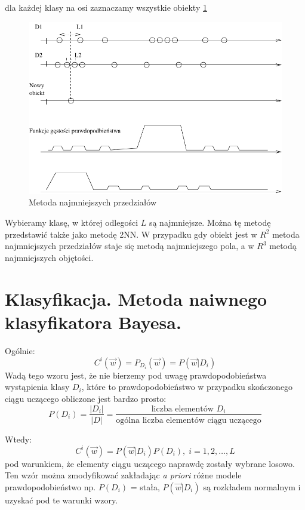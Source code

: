 \documentclass[a4paper,10pt]{article}
\begin{document}
dla każdej klasy na osi zaznaczamy wszystkie obiekty \ref{fig:min_dist}
\begin{figure}[ht]
  \centering
  \includegraphics[width=\textwidth]{min_przed.pdf}
  \caption{Metoda najmniejszych przedziałów}
  \label{fig:min_dist}
\end{figure}

Wybieramy klasę, w której odlegości $L$ są najmniejsze. Można tę metodę przedstawić także jako metodę 2NN.
W przypadku gdy obiekt jest w $R^2$ metoda najmniejszych przedziałów staje się metodą najmniejszego pola, a w $R^3$ metodą najmniejszych objętości.

\section{Klasyfikacja. Metoda naiwnego klasyfikatora Bayesa.}
Ogólnie:
\begin{equation}
C^i(\overrightarrow{w})=P_{D_i}(\overrightarrow{w})=P(\overrightarrow{w}|D_i)
\end{equation}
Wadą tego wzoru jest, że nie bierzemy pod uwagę prawdopodobieństwa wystąpienia klasy $D_i$, które to prawdopodobieństwo w przypadku skończonego ciągu uczącego obliczone jest bardzo prosto:
\begin{equation}
P(D_i)=\frac{|D_i|}{|D|}=\frac{\mbox{liczba elementów $D_i$}}{\mbox{ogólna liczba elementów ciągu uczącego}}
\end{equation}

Wtedy:
\begin{equation}
C^i(\overrightarrow{w})=P(\overrightarrow{w}|D_i)P(D_i),\; i=1,2,\ldots,L
\end{equation}
pod warunkiem, że elementy ciągu uczącego naprawdę zostały wybrane losowo.
Ten wzór można zmodyfikować zakładając \textit{a priori} różne modele prawdopodobieństwo np. $P(D_i)$ = stała, $P(\overrightarrow{w}|D_i)$ są rozkładem normalnym
i uzyskać pod te warunki wzory.
\end{document}
